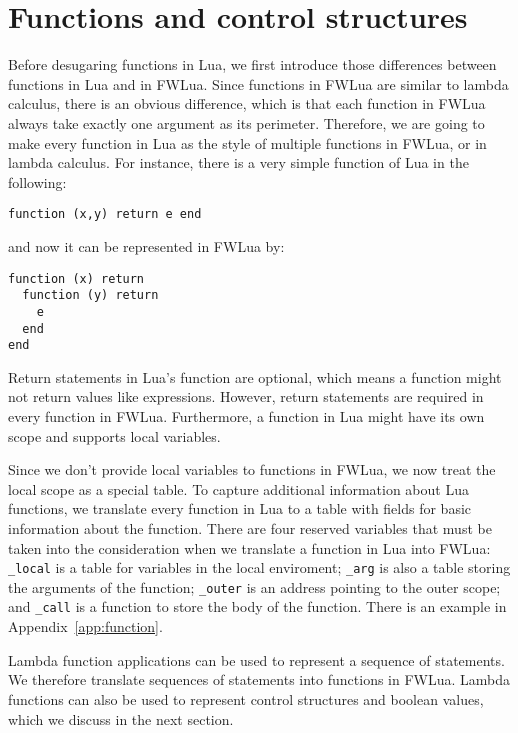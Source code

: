 \section{Functions and control structures}\label{sec:TraFunc}
Before desugaring functions in Lua, we first introduce those differences between functions in Lua and in FWLua. Since functions in FWLua are similar to lambda calculus, there is an obvious difference, which is that each function in FWLua always take exactly one argument as its perimeter. Therefore, we are going to make every function in Lua as the style of multiple functions in FWLua, or in lambda calculus. For instance, there is a very simple function of Lua in the following:

\begin{verbatim}
function (x,y) return e end
\end{verbatim}

and now it can be represented in FWLua by:

\begin{verbatim}
function (x) return 
  function (y) return 
    e
  end
end
\end{verbatim}


Return statements in Lua's function are optional, which means a function might not return values like expressions. However, return statements are required in every function in FWLua.
Furthermore, a function in Lua might have its own scope and supports local variables. 

Since we don't provide local variables to functions in FWLua, we now treat the local scope as a special table.
To capture additional information about Lua functions,
we translate every function in Lua to a table with fields for basic information about the function. There are four reserved variables that must be taken into the consideration when we translate a function in Lua into FWLua: {\tt \_local} is a table for variables in the local enviroment; {\tt \_arg} is also a table storing the arguments of the function; {\tt \_outer} is an address pointing to the outer scope; and {\tt \_call} is a function to store the body of the function. There is an example in Appendix~\ref{app:function}.

Lambda function applications can be used to represent a sequence of  statements. We therefore translate sequences of statements into functions in FWLua. Lambda functions can also be used to represent control structures and boolean values, which we discuss in the next section.

